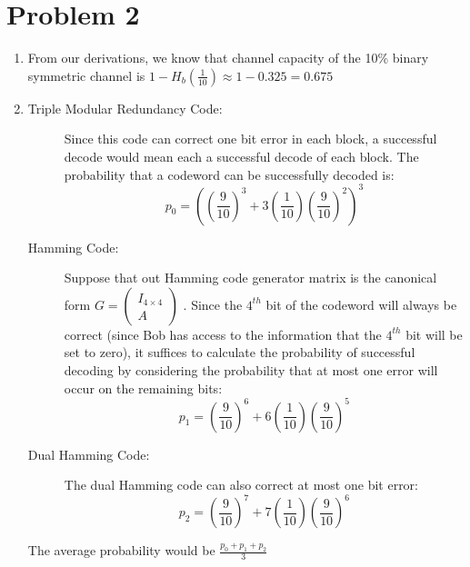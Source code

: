 \documentclass[12pt]{article}%
\begin{document}
\section*{Problem 2}
\begin{enumerate}
	\item From our derivations, we know that channel capacity of the 10\% binary symmetric channel is $1 - H_b(\frac{1}{10}) \approx 1 - 0.325 = 0.675$ 
	\item 
		\begin{description}
			\item[Triple Modular Redundancy Code:] Since this code can correct one bit error in each block, a successful decode would mean each a successful decode of each block. The probability that a codeword can be successfully decoded is:
				\begin{equation*}
					p_0 = \left(\left(\frac{9}{10}\right)^3 + 3\left(\frac{1}{10}\right)\left(\frac{9}{10}\right)^2\right)^3 
				\end{equation*}
			\item[Hamming Code:] Suppose that out Hamming code generator matrix is the canonical form \( G =  \left(\begin{matrix} I_{4\times 4} \\ A \end{matrix} \right)\) . Since the $4^{th}$ bit of the codeword will always be correct (since Bob has access to the information that the $4^{th}$ bit will be set to zero), it suffices to calculate the probability of successful decoding by considering the probability that at most one error will occur on the remaining bits:
				\begin{equation*}
					p_1 = \left(\frac{9}{10}\right)^6 + 6\left(\frac{1}{10}\right)\left(\frac{9}{10} \right)^5
				\end{equation*}
			\item[Dual Hamming Code:] The dual Hamming code can also correct at most one bit error:
				\begin{equation*}
					p_2 = \left(\frac{9}{10}\right)^7 + 7\left(\frac{1}{10}\right)\left(\frac{9}{10} \right)^6 
				\end{equation*}
		\end{description}
		The average probability would be \(\frac{p_0 + p_1 + p_2}{3} \) 
\end{enumerate}
\end{document}
